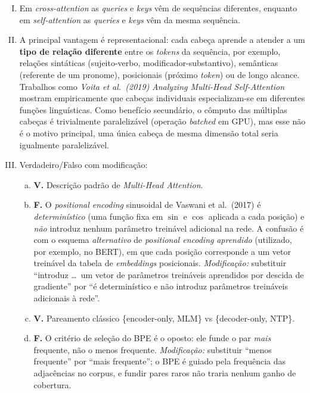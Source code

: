 \documentclass{dlproblemset}
\begin{document}
\begin{enumerate}[I)]
\item Em \textit{cross-attention} as \textit{queries} e \textit{keys} vêm de sequências diferentes, enquanto em \textit{self-attention} as \textit{queries} e \textit{keys} vêm da mesma sequência.

\item A principal vantagem é representacional: cada cabeça aprende a atender a um \textbf{tipo de relação diferente} entre os \textit{tokens} da sequência, por exemplo, relações sintáticas (sujeito-verbo, modificador-substantivo), semânticas (referente de um pronome), posicionais (próximo \textit{token}) ou de longo alcance. Trabalhos como \textit{Voita et al.\ (2019)} \textit{Analyzing Multi-Head Self-Attention} mostram empiricamente que cabeças individuais especializam-se em diferentes funções linguísticas. Como benefício secundário, o cômputo das múltiplas cabeças é trivialmente paralelizável (operação \textit{batched} em GPU), mas esse não é o motivo principal, uma única cabeça de mesma dimensão total seria igualmente paralelizável.


\item Verdadeiro/Falso com modificação:
\begin{enumerate}[a)]
    \item \textbf{V.} Descrição padrão de \textit{Multi-Head Attention}.

    \item \textbf{F.} O \textit{positional encoding} sinusoidal de Vaswani et al.\ (2017) é \emph{determinístico} (uma função fixa em $\sin$ e $\cos$ aplicada a cada posição) e \emph{não} introduz nenhum parâmetro treinável adicional na rede. A confusão é com o esquema \emph{alternativo} de \textit{positional encoding} \emph{aprendido} (utilizado, por exemplo, no BERT), em que cada posição corresponde a um vetor treinável da tabela de \textit{embeddings} posicionais. \textit{Modificação:} substituir ``introduz \ldots\ um vetor de parâmetros treináveis aprendidos por descida de gradiente'' por ``é determinístico e não introduz parâmetros treináveis adicionais à rede''.

    \item \textbf{V.} Pareamento clássico \{encoder-only, MLM\} vs \{decoder-only, NTP\}.

    \item \textbf{F.} O critério de seleção do BPE é o oposto: ele funde o par \emph{mais} frequente, não o menos frequente. \textit{Modificação:} substituir ``menos frequente'' por ``mais frequente''; o BPE é guiado pela frequência das adjacências no corpus, e fundir pares raros não traria nenhum ganho de cobertura.


\end{enumerate}
\end{enumerate}
\end{document}
